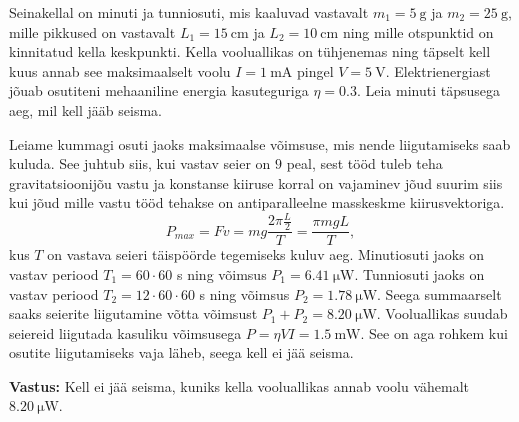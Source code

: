 \setAuthor{}

Seinakellal on minuti ja tunniosuti, mis kaaluvad vastavalt
$m_1=\SI{5}{\gram}$ ja $m_2=\SI{25}{\gram}$, mille pikkused on vastavalt
$L_1=\SI{15}{\centi\meter}$ ja $L_2=\SI{10}{\centi\meter}$ ning mille otspunktid
on kinnitatud kella keskpunkti. Kella vooluallikas on tühjenemas ning täpselt kell kuus annab see maksimaalselt voolu $I=\SI{1}{\milli\ampere}$ pingel
$V=\SI{5}{\volt}$. Elektrienergiast jõuab osutiteni mehaaniline energia
kasuteguriga $\eta=0.3$. Leia minuti täpsusega aeg, mil kell jääb seisma. 

\hint

\solu
Leiame kummagi osuti jaoks maksimaalse võimsuse, mis nende liigutamiseks saab
kuluda. See juhtub siis, kui vastav seier on $9$ peal, sest tööd tuleb teha
gravitatsioonijõu vastu ja konstanse kiiruse korral on vajaminev jõud suurim
siis kui jõud mille vastu tööd tehakse on antiparalleelne masskeskme
kiirusvektoriga.
$$P_{max} = F v = mg \frac{2 \pi \frac{L}{2}}{T} = \frac{\pi mgL}{T},$$
kus $T$ on vastava seieri täispöörde tegemiseks kuluv aeg.
Minutiosuti jaoks on vastav periood $T_1={60\cdot60}$ s ning võimsus $P_1 =\SI{6.41}{\micro\watt}$.
Tunniosuti jaoks on vastav periood $T_2={12\cdot 60\cdot60}$ s ning võimsus $P_2=\SI{1.78}{\micro\watt}$. Seega summaarselt saaks
seierite liigutamine võtta võimsust $P_1+P_2 = \SI {8.20}{\micro\watt}$.
Vooluallikas suudab seiereid liigutada kasuliku võimsusega
$P=\eta VI=\SI{1.5}{\milli\watt}$. See on aga rohkem kui osutite liigutamiseks
vaja läheb, seega kell ei jää seisma.

\textbf{Vastus:}
Kell ei jää seisma, kuniks kella vooluallikas annab voolu vähemalt
$\SI {8.20}{\micro\watt}$.
\probend